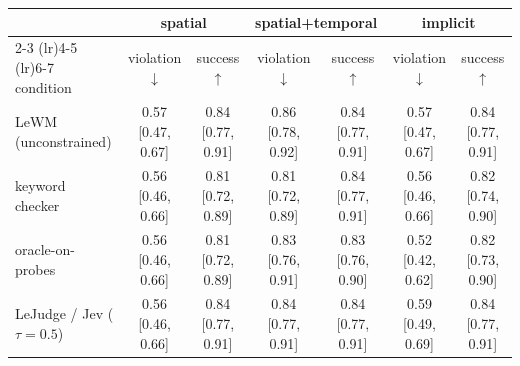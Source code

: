 \begin{tabular}{lcccccc}
\toprule
& \multicolumn{2}{c}{spatial} & \multicolumn{2}{c}{spatial+temporal} & \multicolumn{2}{c}{implicit} \\
\cmidrule(lr){2-3} \cmidrule(lr){4-5} \cmidrule(lr){6-7}
condition & violation $\downarrow$ & success $\uparrow$ & violation $\downarrow$ & success $\uparrow$ & violation $\downarrow$ & success $\uparrow$ \\
\midrule
LeWM (unconstrained) & 0.57 {\scriptsize[0.47, 0.67]} & 0.84 {\scriptsize[0.77, 0.91]} & 0.86 {\scriptsize[0.78, 0.92]} & 0.84 {\scriptsize[0.77, 0.91]} & 0.57 {\scriptsize[0.47, 0.67]} & 0.84 {\scriptsize[0.77, 0.91]} \\
keyword checker & 0.56 {\scriptsize[0.46, 0.66]} & 0.81 {\scriptsize[0.72, 0.89]} & 0.81 {\scriptsize[0.72, 0.89]} & 0.84 {\scriptsize[0.77, 0.91]} & 0.56 {\scriptsize[0.46, 0.66]} & 0.82 {\scriptsize[0.74, 0.90]} \\
oracle-on-probes & 0.56 {\scriptsize[0.46, 0.66]} & 0.81 {\scriptsize[0.72, 0.89]} & 0.83 {\scriptsize[0.76, 0.91]} & 0.83 {\scriptsize[0.76, 0.90]} & 0.52 {\scriptsize[0.42, 0.62]} & 0.82 {\scriptsize[0.73, 0.90]} \\
LeJudge / Jev ($\tau{=}0.5$) & 0.56 {\scriptsize[0.46, 0.66]} & 0.84 {\scriptsize[0.77, 0.91]} & 0.84 {\scriptsize[0.77, 0.91]} & 0.84 {\scriptsize[0.77, 0.91]} & 0.59 {\scriptsize[0.49, 0.69]} & 0.84 {\scriptsize[0.77, 0.91]} \\
\bottomrule
\end{tabular}